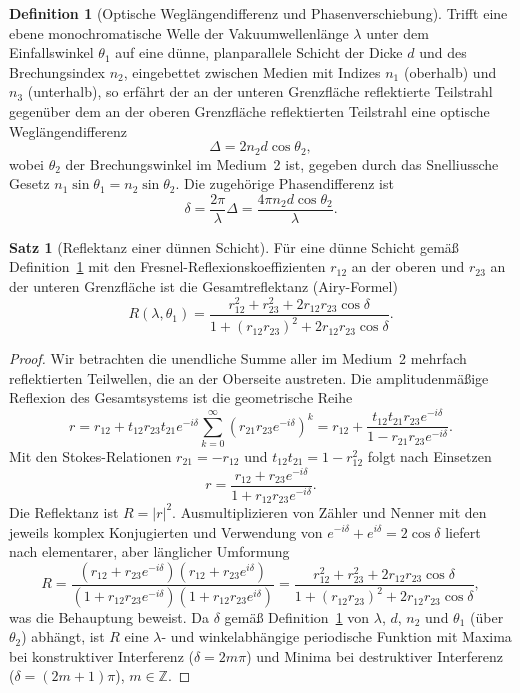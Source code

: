 ﻿\documentclass[a4paper,12pt]{article}
\theoremstyle{definition}
\newtheorem{definition}{Definition}
\newtheorem{satz}{Satz}
\begin{document}
\begin{definition}[Optische Weglängendifferenz und Phasenverschiebung]
	\label{def:owl}
	Trifft eine ebene monochromatische Welle der Vakuumwellenlänge $\lambda$
	unter dem Einfallswinkel $\theta_1$ auf eine dünne, planparallele Schicht
	der Dicke $d$ und des Brechungsindex $n_2$, eingebettet zwischen Medien
	mit Indizes $n_1$ (oberhalb) und $n_3$ (unterhalb), so erfährt der an der
	unteren Grenzfläche reflektierte Teilstrahl gegenüber dem an der oberen
	Grenzfläche reflektierten Teilstrahl eine optische Weglängendifferenz
	\[
	\Delta = 2 n_2 d \cos\theta_2,
	\]
	wobei $\theta_2$ der Brechungswinkel im Medium~2 ist, gegeben durch das
	Snelliussche Gesetz $n_1 \sin\theta_1 = n_2 \sin\theta_2$.
	Die zugehörige Phasendifferenz ist
	\[
	\delta = \frac{2\pi}{\lambda}\Delta = \frac{4\pi n_2 d \cos\theta_2}{\lambda}.
	\]
\end{definition}

\begin{satz}[Reflektanz einer dünnen Schicht]
	\label{satz:airy}
	Für eine dünne Schicht gemäß Definition~\ref{def:owl} mit den
	Fresnel-Reflexionskoeffizienten $r_{12}$ an der oberen und $r_{23}$ an
	der unteren Grenzfläche ist die Gesamtreflektanz (Airy-Formel)
	\[
	R(\lambda,\theta_1) = \frac{r_{12}^2 + r_{23}^2 + 2 r_{12} r_{23}
		\cos\delta}{1 + (r_{12} r_{23})^2 + 2 r_{12} r_{23} \cos\delta}.
	\]
\end{satz}

\begin{proof}
	Wir betrachten die unendliche Summe aller im Medium~2 mehrfach
	reflektierten Teilwellen, die an der Oberseite austreten. Die
	amplitudenmäßige Reflexion des Gesamtsystems ist die geometrische Reihe
	\[
	r = r_{12} + t_{12} r_{23} t_{21} e^{-i\delta}
	\sum_{k=0}^{\infty} \left(r_{21} r_{23} e^{-i\delta}\right)^k
	= r_{12} + \frac{t_{12} t_{21} r_{23} e^{-i\delta}}
	{1 - r_{21} r_{23} e^{-i\delta}}.
	\]
	Mit den Stokes-Relationen $r_{21} = -r_{12}$ und
	$t_{12} t_{21} = 1 - r_{12}^2$ folgt nach Einsetzen
	\[
	r = \frac{r_{12} + r_{23} e^{-i\delta}}{1 + r_{12} r_{23} e^{-i\delta}}.
	\]
	Die Reflektanz ist $R = |r|^2$. Ausmultiplizieren von Zähler und Nenner
	mit den jeweils komplex Konjugierten und Verwendung von
	$e^{-i\delta} + e^{i\delta} = 2\cos\delta$ liefert nach
	elementarer, aber länglicher Umformung
	\[
	R = \frac{(r_{12}+r_{23}e^{-i\delta})(r_{12}+r_{23}e^{i\delta})}
	{(1+r_{12}r_{23}e^{-i\delta})(1+r_{12}r_{23}e^{i\delta})}
	= \frac{r_{12}^2 + r_{23}^2 + 2 r_{12} r_{23}\cos\delta}
	{1 + (r_{12}r_{23})^2 + 2 r_{12}r_{23}\cos\delta},
	\]
	was die Behauptung beweist. Da $\delta$ gemäß Definition~\ref{def:owl}
	von $\lambda$, $d$, $n_2$ und $\theta_1$ (über $\theta_2$) abhängt, ist
	$R$ eine $\lambda$- und winkelabhängige periodische Funktion mit
	Maxima bei konstruktiver Interferenz ($\delta = 2m\pi$) und Minima bei
	destruktiver Interferenz ($\delta = (2m+1)\pi$), $m \in \mathbb{Z}$.
\end{proof}
\end{document}
